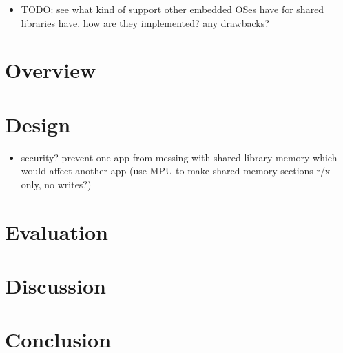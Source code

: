 \documentclass{article}
\begin{document}
\begin{itemize}
    \item TODO: see what kind of support other embedded OSes have for shared libraries have. how are they implemented? any drawbacks?
\end{itemize}

\section*{Overview}

\section*{Design}

\begin{itemize}
    \item security? prevent one app from messing with shared library memory which would affect another app (use MPU to make shared memory sections r/x only, no writes?)
\end{itemize}

\section*{Evaluation}

\section*{Discussion}

\section*{Conclusion}
\end{document}
